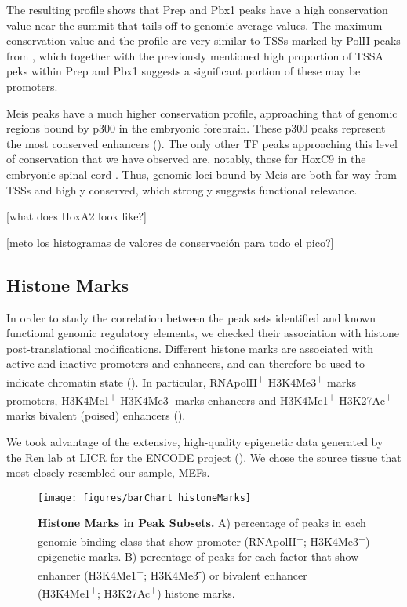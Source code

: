 The resulting profile shows that Prep and Pbx1 peaks have a high conservation value near the summit that tails off to genomic average values. The maximum conservation value and the profile are very similar to \acp{TSS} marked by \ac{PolII} peaks from \cite{Mahony2011}, which together with the previously mentioned high proportion of \ac{TSSA} peks within Prep and Pbx1 suggests a significant portion of these may be promoters.

Meis peaks have a much higher conservation profile, approaching that of genomic regions bound by p300 in the embryonic forebrain. These p300 peaks represent the most conserved enhancers (\cite{Blow2010}). The only other \ac{TF} peaks approaching this level of conservation that we have observed are, notably, those for HoxC9 in the embryonic spinal cord \cite{Jung2010}. Thus, genomic loci bound by Meis are both far way from \acp{TSS} and highly conserved, which strongly suggests functional relevance.

[what does HoxA2 look like?] 

[meto los histogramas de valores de conservación para todo el pico?]

\subsection{Histone Marks}

In order to study the correlation between the peak sets identified and known functional genomic regulatory elements, we checked their association with histone post-translational modifications. Different histone marks are associated with active and inactive promoters and enhancers, and can therefore be used to indicate chromatin state (\cite{Mikkelsen2007}). In particular, RNApolII\textsuperscript{+} H3K4Me3\textsuperscript{+} marks promoters,  H3K4Me1\textsuperscript{+} H3K4Me3\textsuperscript{-} marks enhancers and H3K4Me1\textsuperscript{+} H3K27Ac\textsuperscript{+} marks bivalent (poised) enhancers (\cite{Creyghton2010}). 

We took advantage of the extensive, high-quality epigenetic data generated by the Ren lab at LICR for the ENCODE project (\cite{Shen2012}). We chose the source tissue that most closely resembled our sample, \acp{MEF}. 

\begin{figure}[]
  \centering
  \texttt{[image: figures/barChart\_histoneMarks]}
  \caption[Histone Marks in Peak Subsets]{\textbf{Histone Marks in Peak Subsets.} A) percentage of peaks in each genomic binding class that show promoter (RNApolII\textsuperscript{+}; H3K4Me3\textsuperscript{+}) epigenetic marks. B) percentage of peaks for each factor that show enhancer (H3K4Me1\textsuperscript{+}; H3K4Me3\textsuperscript{-}) or bivalent enhancer (H3K4Me1\textsuperscript{+}; H3K27Ac\textsuperscript{+}) histone marks.}
  \label{fig:histoneMarks}
\end{figure}

